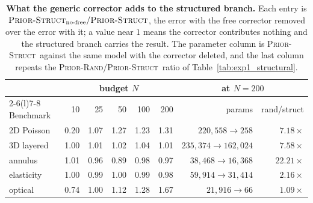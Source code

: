 \documentclass{article}
\newcommand{\armstruct}{\textsc{Prior-Struct}}
\newcommand{\armrand}{\textsc{Prior-Rand}}
\begin{document}
\begin{table}[t]
\centering
\caption{\textbf{What the generic corrector adds to the structured branch.} Each entry is
$\armstruct_{\text{no-free}}/\armstruct$, the error with the free corrector removed over the error
with it; a value near $1$ means the corrector contributes nothing and the structured branch carries
the result. The parameter column is \armstruct\ against the same model with the corrector deleted,
and the last column repeats the \armrand/\armstruct\ ratio of Table~\ref{tab:exp1_structural}.}
\label{tab:nofree}
\footnotesize
\setlength{\tabcolsep}{10pt}
\renewcommand{\arraystretch}{0.7}
  \vspace{1mm}
\begin{tabular}{@{}lrrrrrrr@{}}
\toprule
& \multicolumn{5}{c}{budget $N$} & \multicolumn{2}{c}{at $N=200$} \\
\cmidrule(lr){2-6}\cmidrule(l){7-8}
Benchmark & 10 & 25 & 50 & 100 & 200 & params & rand/struct \\
\midrule
2D Poisson   & 0.20 & 1.07 & 1.27 & 1.23 & 1.31 & $220{,}558\!\to\!258$ & $7.18\times$ \\
3D layered   & 1.00 & 1.01 & 1.02 & 1.04 & 1.01 & $235{,}374\!\to\!162{,}024$ & $7.58\times$ \\
annulus      & 1.01 & 0.96 & 0.89 & 0.98 & 0.97 & $38{,}468\!\to\!16{,}368$ & $22.21\times$ \\
elasticity   & 1.00 & 0.99 & 1.00 & 0.99 & 0.98 & $59{,}914\!\to\!31{,}414$ & $2.16\times$ \\
optical      & 0.74 & 1.00 & 1.12 & 1.28 & 1.67 & $21{,}916\!\to\!66$ & $1.09\times$ \\
\bottomrule
\end{tabular}
  \vspace{-3mm}
\end{table}
\end{document}
